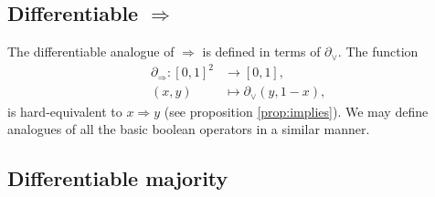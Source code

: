 \documentclass{article} %
\begin{document}

\subsection{Differentiable $\Rightarrow$}

The differentiable analogue of $\Rightarrow$ is defined in terms of $\partial_{\vee}$. The function
\begin{equation*}
\begin{aligned}
\partial_{\Rightarrow}: [0,1]^{2} &\to [0,1],\\
(x, y) &\mapsto \partial_{\vee}\!(y, 1-x)\text{,}
\end{aligned}
\end{equation*}
is hard-equivalent to $x \Rightarrow y$ (see proposition \ref{prop:implies}). We may define  analogues of all the basic boolean operators in a similar manner.

\subsection{Differentiable majority}
\end{document}
